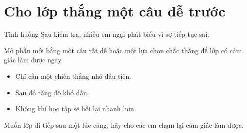 \section{Cho lớp thắng một câu dễ trước}
\begin{tinhhuong}{Tình huống}
Sau kiểm tra, nhiều em ngại phát biểu vì sợ tiếp tục sai.
\end{tinhhuong}
\begin{goiydungngay}
Mở phần mới bằng một câu rất dễ hoặc một lựa chọn chắc thắng để lớp có cảm giác làm được ngay.
\begin{itemize}
\item Chỉ cần một chiến thắng nhỏ đầu tiên.
\item Sau đó tăng độ khó dần.
\item Không khí học tập sẽ hồi lại nhanh hơn.
\end{itemize}
\end{goiydungngay}
\begin{cauchot}
Muốn lớp đi tiếp sau một lúc căng, hãy cho các em chạm lại cảm giác làm được.
\end{cauchot}
